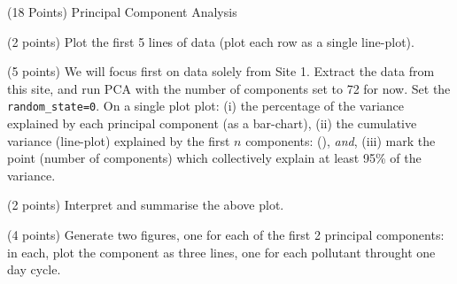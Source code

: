 \documentclass[12pt]{article}
\begin{document}

\begin{question}{(18 Points) Principal Component Analysis}




\begin{subquestion}{(2 points) Plot the first 5 lines of data (plot each row as a single line-plot).}






\end{subquestion}



\begin{subquestion}{(5 points) We will focus first on data solely from Site 1. Extract the data from this site, and run PCA with the number of components set to 72 for now. Set the \texttt{random\_state=0}. On a single plot plot: (i) the percentage of the variance explained by each principal component (as a bar-chart), (ii) the cumulative variance (line-plot) explained by the first $n$ components: (), \textsl{and}, (iii) mark the point (number of components) which collectively explain at least 95\% of the variance. }






\end{subquestion}

\begin{subquestion}{(2 points) Interpret and summarise the above plot.}






\end{subquestion}


\begin{subquestion}{(4 points) Generate two figures, one for each of the first 2 principal components: in each, plot the component as three lines, one for each pollutant throught one day cycle. }




\end{subquestion}
\end{question}
\end{document}
